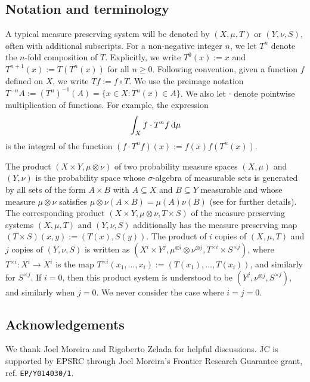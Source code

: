 \documentclass[reqno,a4paper,12pt]{amsart}
\theoremstyle{definition}
\theoremstyle{remark}
\def\d{{\,{\rm d}}}
\begin{document}
\subsection*{Notation and terminology}

A typical measure preserving system will be denoted by $(X,\mu,T)$ or $(Y,\nu,S)$, often with additional subscripts. For a non-negative integer $n$, we let $T^n$ denote the $n$-fold composition of $T$. Explicitly, we write $T^0(x):=x$ and $T^{n+1}(x):=T(T^n(x))$ for all $n\geqslant 0$. Following convention, given a function $f$ defined on $X$, we write $Tf := f\circ T$. We use the preimage notation $T^{-n}A:=(T^n)^{-1}(A)=\{x\in X: T^n(x)\in A\}$. We also let $\cdot$ denote pointwise multiplication of functions. For example, the expression
\begin{equation*}
    \int_X f\cdot T^nf\d\mu
\end{equation*}
is the integral of the function $(f\cdot T^nf)(x):=f(x)f(T^n(x))$.

The product $(X\times Y, \mu\otimes\nu)$ of two probability measure spaces $(X,\mu)$ and $(Y,\nu)$ is the probability space whose $\sigma$-algebra of measurable sets is generated by all sets of the form $A\times B$ with $A\subseteq X$ and $B\subseteq Y$ measurable and whose measure $\mu\otimes\nu$ satisfies $\mu\otimes \nu(A\times B) = \mu(A)\nu(B)$ (see \cite[\S1.7]{Tao2011} for further details). The corresponding product $(X\times Y, \mu\otimes\nu, T\times S)$ of the measure preserving systems $(X,\mu,T)$ and $(Y,\nu,S)$ additionally has the measure preserving map $(T\times S)(x,y):= (T(x),S(y))$. The product of $i$ copies of $(X,\mu,T)$ and $j$ copies of $(Y,\nu,S)$ is written as $(X^i\times Y^j,\mu^{\otimes i}\otimes\nu^{\otimes j}, T^{\times i}\times S^{\times j})$, where $T^{\times i}:X^i\to X^i$ is the map $T^{\times i}(x_1,\ldots,x_i):= (T(x_1),\ldots,T(x_i))$, and similarly for $S^{\times j}$. If $i=0$, then this product system is understood to be $(Y^j,\nu^{\otimes j},S^{\times j})$, and similarly when $j=0$. We never consider the case where $i=j=0$.


\subsection*{Acknowledgements} We thank Joel Moreira and Rigoberto Zelada for helpful discussions. JC is supported by EPSRC through Joel Moreira's Frontier Research Guarantee grant, ref. \texttt{EP/Y014030/1}.
\end{document}
